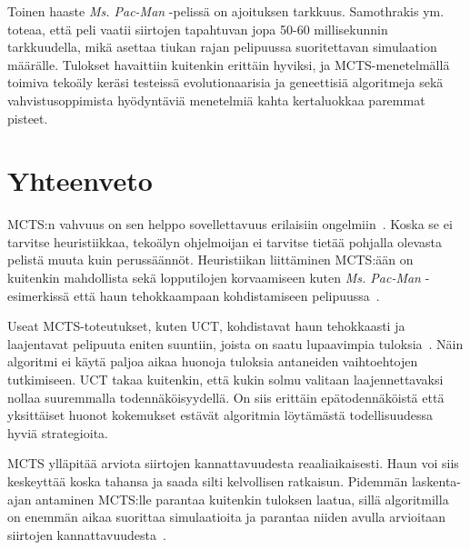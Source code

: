\documentclass[12pt,finnish]{tktltiki2}
\theoremstyle{definition}
\theoremstyle{remark}
\begin{document}
Toinen haaste \textit{Ms. Pac-Man} -pelissä on ajoituksen tarkkuus. Samothrakis ym. toteaa, että peli vaatii siirtojen tapahtuvan jopa 50-60 millisekunnin tarkkuudella, mikä asettaa tiukan rajan pelipuussa suoritettavan simulaation määrälle. Tulokset havaittiin kuitenkin erittäin hyviksi, ja MCTS-menetelmällä toimiva tekoäly keräsi testeissä evolutionaarisia ja geneettisiä algoritmeja sekä vahvistusoppimista hyödyntäviä menetelmiä kahta kertaluokkaa paremmat pisteet.

\section{Yhteenveto}

MCTS:n vahvuus on sen helppo sovellettavuus erilaisiin ongelmiin~\cite{browne}. Koska se ei tarvitse heuristiikkaa, tekoälyn ohjelmoijan ei tarvitse tietää pohjalla olevasta pelistä muuta kuin perussäännöt. Heuristiikan liittäminen MCTS:ään on kuitenkin mahdollista sekä lopputilojen korvaamiseen kuten \textit{Ms. Pac-Man} -esimerkissä että haun tehokkaampaan kohdistamiseen pelipuussa~\cite{browne}.

Useat MCTS-toteutukset, kuten UCT, kohdistavat haun tehokkaasti ja laajentavat pelipuuta eniten suuntiin, joista on saatu lupaavimpia tuloksia~\cite{browne}. Näin algoritmi ei käytä paljoa aikaa huonoja tuloksia antaneiden vaihtoehtojen tutkimiseen. UCT takaa kuitenkin, että kukin solmu valitaan laajennettavaksi nollaa suuremmalla todennäköisyydellä. On siis erittäin epätodennäköistä että yksittäiset huonot kokemukset estävät algoritmia löytämästä todellisuudessa hyviä strategioita.

MCTS ylläpitää arviota siirtojen kannattavuudesta reaaliaikaisesti. Haun voi siis keskeyttää koska tahansa ja saada silti kelvollisen ratkaisun. Pidemmän laskenta-ajan antaminen MCTS:lle parantaa kuitenkin tuloksen laatua, sillä algoritmilla on enemmän aikaa suorittaa simulaatioita ja parantaa niiden avulla arvioitaan siirtojen kannattavuudesta~\cite{browne}.


%
%
% 
%







% 
\end{document}
